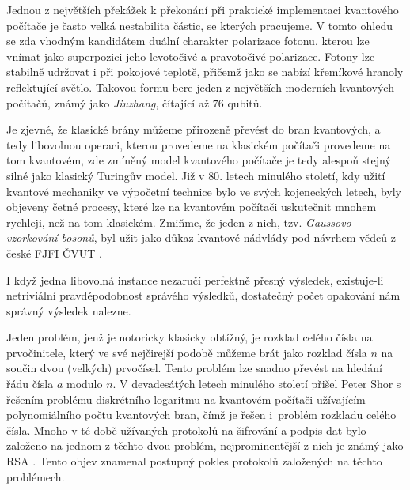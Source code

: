 \documentclass[12pt]{report}
\begin{document}
Jednou z největších překážek k překonání při praktické implementaci kvantového počítače je často velká nestabilita částic, se kterých pracujeme. V tomto ohledu se zda vhodným kandidátem duální charakter polarizace fotonu, kterou lze vnímat jako superpozici jeho levotočivé a pravotočivé polarizace. Fotony lze stabilně udržovat i při pokojové teplotě, přičemž jako  se nabízí křemíkové hranoly reflektující světlo. Takovou formu bere jeden z největších moderních kvantových počítačů, známý jako \textit{Jiuzhang}, čítající až $76$ qubitů. 

Je zjevné, že klasické brány můžeme přirozeně převést do bran kvantových, a tedy libovolnou operaci, kterou provedeme na klasickém počítači provedeme na tom kvantovém, zde zmíněný model kvantového počítače je tedy alespoň stejný silné jako klasický Turingův model. Již v $80$. letech minulého století, kdy užití kvantové mechaniky ve výpočetní technice bylo ve svých kojeneckých letech, byly objeveny četné procesy, které lze na kvantovém počítači uskutečnit mnohem rychleji, než na tom klasickém. Zmiňme, že jeden z nich, tzv. \textit{Gaussovo vzorkování bosonů}, byl užit jako důkaz kvantové nádvlády pod návrhem vědců z české FJFI ČVUT \cite{Science}.

I když jedna libovolná instance nezaručí perfektně přesný výsledek, existuje-li netriviální pravděpodobnost správého výsledků, dostatečný počet opakování nám správný výsledek nalezne.


Jeden problém, jenž je notoricky klasicky obtížný, je rozklad celého čísla na prvočinitele, který ve své nejčirejší podobě můžeme brát jako rozklad čísla $n$ na součin dvou (velkých) prvočísel. Tento problém lze snadno převést na hledání řádu čísla $a$ modulo $n$. V devadesátých letech minulého století přišel Peter Shor \cite{Shor} s řešením problému diskrétního logaritmu na kvantovém počítači užívajícím polynomiálního počtu kvantových bran, čímž je řešen i~problém rozkladu celého čísla. Mnoho v té době užívaných protokolů na šifrování a podpis dat bylo založeno na jednom z těchto dvou problém, nejprominentější z nich je známý jako RSA \cite{RSA}. Tento objev znamenal postupný pokles protokolů založených na těchto problémech.
\end{document}
